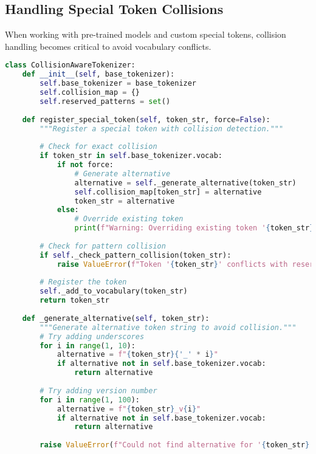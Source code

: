 \subsection{Handling Special Token Collisions}

When working with pre-trained models and custom special tokens, collision handling becomes critical to avoid vocabulary conflicts.
\begin{comment}
Feedback: It's helpful to explain the problem before showing the solution. For example: "A common issue arises when a special token you want to add (e.g., `<USER>`) already exists as a regular token in the pre-trained tokenizer's vocabulary. Simply adding it again can cause ambiguity. A robust implementation should detect these collisions and either force an override (if intended) or automatically generate a non-colliding alternative (e.g., `<USER_>`)."
\end{comment}

\begin{lstlisting}[language=Python, caption=Collision detection and resolution]
class CollisionAwareTokenizer:
    def __init__(self, base_tokenizer):
        self.base_tokenizer = base_tokenizer
        self.collision_map = {}
        self.reserved_patterns = set()
        
    def register_special_token(self, token_str, force=False):
        """Register a special token with collision detection."""
        
        # Check for exact collision
        if token_str in self.base_tokenizer.vocab:
            if not force:
                # Generate alternative
                alternative = self._generate_alternative(token_str)
                self.collision_map[token_str] = alternative
                token_str = alternative
            else:
                # Override existing token
                print(f"Warning: Overriding existing token '{token_str}'")
                
        # Check for pattern collision
        if self._check_pattern_collision(token_str):
            raise ValueError(f"Token '{token_str}' conflicts with reserved pattern")
            
        # Register the token
        self._add_to_vocabulary(token_str)
        return token_str
        
    def _generate_alternative(self, token_str):
        """Generate alternative token string to avoid collision."""
        # Try adding underscores
        for i in range(1, 10):
            alternative = f"{token_str}{'_' * i}"
            if alternative not in self.base_tokenizer.vocab:
                return alternative
                
        # Try adding version number
        for i in range(1, 100):
            alternative = f"{token_str}_v{i}"
            if alternative not in self.base_tokenizer.vocab:
                return alternative
                
        raise ValueError(f"Could not find alternative for '{token_str}'")
\end{lstlisting}

